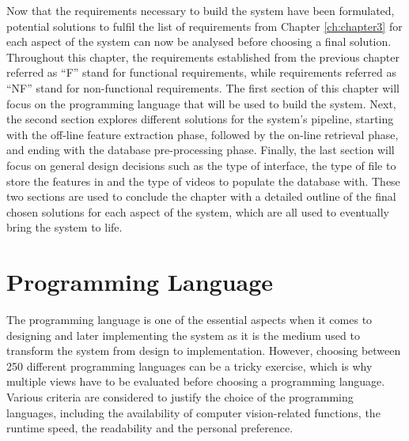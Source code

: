 Now that the requirements necessary to build the system have been formulated, potential solutions to fulfil the list of requirements from Chapter \ref{ch:chapter3} for each aspect of the system can now be analysed before choosing a final solution. Throughout this chapter, the requirements established from the previous chapter referred as ``F'' stand for functional requirements, while requirements referred as ``NF'' stand for non-functional requirements. The first section of this chapter will focus on the programming language that will be used to build the system. Next, the second section explores different solutions for the system's pipeline, starting with the off-line feature extraction phase, followed by the on-line retrieval phase, and ending with the database pre-processing phase. Finally, the last section will focus on general design decisions such as the type of interface, the type of file to store the features in and the type of videos to populate the database with. These two sections are used to conclude the chapter with a detailed outline of the final chosen solutions for each aspect of the system, which are all used to eventually bring the system to life.


\section{Programming Language}
\label{sec:design-programming-languages}

The programming language is one of the essential aspects when it comes to designing and later implementing the system as it is the medium used to transform the system from design to implementation. However, choosing between 250 different programming languages \cite{tiobe} can be a tricky exercise, which is why multiple views have to be evaluated before choosing a programming language. Various criteria are considered to justify the choice of the programming languages, including the availability of computer vision-related functions, the runtime speed, the readability and the personal preference.\\

